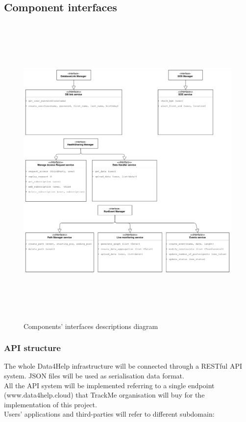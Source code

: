 \documentclass[DD.tex]{subfiles}
\begin{document}
\subsection{Component interfaces}
\begin{figure}[h!]
	\centering
	\includegraphics[height=16.00cm,keepaspectratio]{Figures/Interfaces}
	\caption{Components' interfaces descriptions diagram}
\end{figure}



\newpage

\subsubsection{API structure}
The whole Data4Help infrastructure will be connected through a RESTful API system. JSON files will be used as serialisation data format.\\
All the API system will be implemented referring to a single endpoint (www.data4help.cloud) that TrackMe organisation will buy for the implementation of this project.
\\Users' applications and third-parties will refer to different subdomain:
\end{document}

